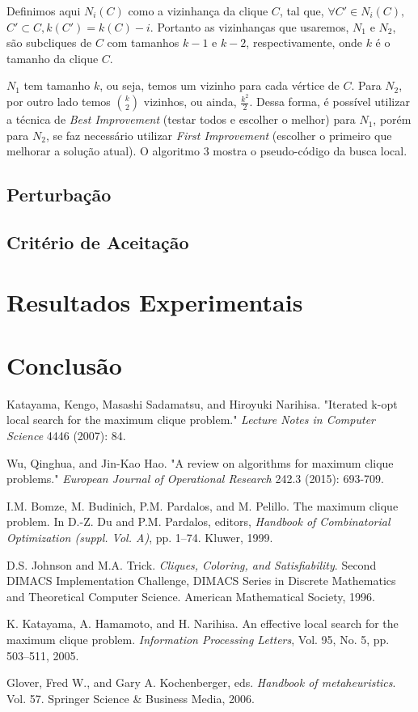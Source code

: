 \documentclass{article}
\begin{document}
Definimos aqui $N_i(C)$ como a vizinhança da clique $C$, tal que, $\forall C' \in N_i(C), $\\$C' \subset C,  k(C') = k(C)-i$. Portanto as vizinhanças que usaremos, $N_1$ e $N_2$, são subcliques de $C$ com tamanhos $k-1$ e $k-2$, respectivamente, onde $k$ é o tamanho da clique $C$.\par

$N_1$ tem tamanho $k$, ou seja, temos um vizinho para cada vértice de $C$. Para $N_2$, por outro lado temos $\binom{k}{2}$  vizinhos, ou ainda, $\frac{k^2}{2}$. Dessa forma, é possível utilizar a técnica de \textit{Best Improvement} (testar todos e escolher o melhor) para $N_1$, porém para $N_2$, se faz necessário utilizar \textit{First Improvement} (escolher o primeiro que melhorar a solução atual). O algoritmo 3 mostra o pseudo-código da busca local.\par

\subsection{Perturbação}
\subsection{Critério de Aceitação}
\section{Resultados Experimentais}
\section{Conclusão}


\begin{thebibliography}{58}

  Katayama, Kengo, Masashi Sadamatsu, and Hiroyuki Narihisa. 
"Iterated k-opt local search for the maximum clique problem." 
\textit{Lecture Notes in Computer Science} 4446 (2007): 84.

Wu, Qinghua, and Jin-Kao Hao. 
"A review on algorithms for maximum clique problems." 
\textit{European Journal of Operational Research} 242.3 (2015): 693-709.

I.M. Bomze, M. Budinich, P.M. Pardalos, and M. Pelillo. The maximum clique
problem. In D.-Z. Du and P.M. Pardalos, editors, \textit{Handbook of Combinatorial
Optimization (suppl. Vol. A)}, pp. 1–74. Kluwer, 1999.

D.S. Johnson and M.A. Trick. \textit{Cliques, Coloring, and Satisfiability}. Second DIMACS
Implementation Challenge, DIMACS Series in Discrete Mathematics and
Theoretical Computer Science. American Mathematical Society, 1996.

 K. Katayama, A. Hamamoto, and H. Narihisa. An effective local search for the
maximum clique problem. \textit{Information Processing Letters}, Vol. 95, No. 5, pp.
503–511, 2005.

Glover, Fred W., and Gary A. Kochenberger, eds. \textit{Handbook of metaheuristics}. Vol. 57. Springer Science \& Business Media, 2006.

\end{thebibliography}
\end{document}
